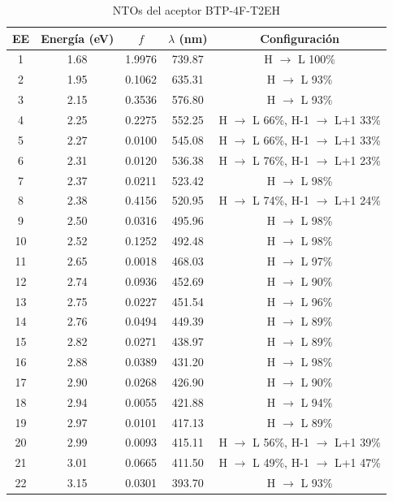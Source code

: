 \begin{table}[H]
\caption{NTOs del aceptor BTP-4F-T2EH}
\label{table:R25B-4} \vspace{-0.5cm}
{\footnotesize
\begin{center} 
\begin{tabular}{ccccc}
\hline
EE & Energía (eV) & $f$ & $\lambda$ (nm) & Configuración \\ \hline
1 & 1.68 & 1.9976 & 739.87 & H $\rightarrow$ L 100\% \\
2 & 1.95 & 0.1062 & 635.31 & H $\rightarrow$ L 93\% \\
3 & 2.15 & 0.3536 & 576.80 & H $\rightarrow$ L 93\% \\
4 & 2.25 & 0.2275 & 552.25 & H $\rightarrow$ L 66\%, H-1 $\rightarrow$ L+1 33\% \\
5 & 2.27 & 0.0100 & 545.08 & H $\rightarrow$ L 66\%, H-1 $\rightarrow$ L+1 33\% \\
6 & 2.31 & 0.0120 & 536.38 & H $\rightarrow$ L 76\%, H-1 $\rightarrow$ L+1 23\% \\
7 & 2.37 & 0.0211 & 523.42 & H $\rightarrow$ L 98\% \\
8 & 2.38 & 0.4156 & 520.95 & H $\rightarrow$ L 74\%, H-1 $\rightarrow$ L+1 24\% \\
9 & 2.50 & 0.0316 & 495.96 & H $\rightarrow$ L 98\% \\
10 & 2.52 & 0.1252 & 492.48 & H $\rightarrow$ L 98\% \\
11 & 2.65 & 0.0018 & 468.03 & H $\rightarrow$ L 97\% \\
12 & 2.74 & 0.0936 & 452.69 & H $\rightarrow$ L 90\% \\
13 & 2.75 & 0.0227 & 451.54 & H $\rightarrow$ L 96\% \\
14 & 2.76 & 0.0494 & 449.39 & H $\rightarrow$ L 89\% \\
15 & 2.82 & 0.0271 & 438.97 & H $\rightarrow$ L 89\% \\
16 & 2.88 & 0.0389 & 431.20 & H $\rightarrow$ L 98\% \\
17 & 2.90 & 0.0268 & 426.90 & H $\rightarrow$ L 90\% \\
18 & 2.94 & 0.0055 & 421.88 & H $\rightarrow$ L 94\% \\
19 & 2.97 & 0.0101 & 417.13 & H $\rightarrow$ L 89\% \\
20 & 2.99 & 0.0093 & 415.11 & H $\rightarrow$ L 56\%, H-1 $\rightarrow$ L+1 39\% \\
21 & 3.01 & 0.0665 & 411.50 & H $\rightarrow$ L 49\%, H-1 $\rightarrow$ L+1 47\% \\
22 & 3.15 & 0.0301 & 393.70 & H $\rightarrow$ L 93\% \\

\end{tabular}
\end{center}}
\end{table}
